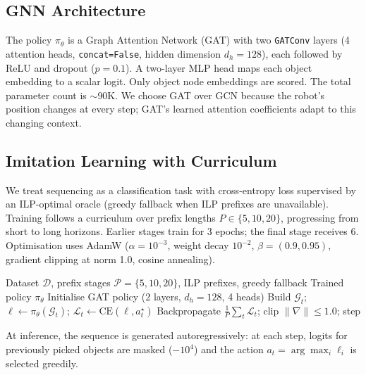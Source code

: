\documentclass[conference]{IEEEtran}
\begin{document}
\subsection{GNN Architecture}

The policy $\pi_\theta$ is a Graph Attention Network (GAT) with two \texttt{GATConv} layers (4 attention heads, \texttt{concat=False}, hidden dimension $d_h{=}128$), each followed by ReLU and dropout ($p{=}0.1$). A two-layer MLP head maps each object embedding to a scalar logit. Only object node embeddings are scored. The total parameter count is ${\sim}$90K. We choose GAT over GCN because the robot's position changes at every step; GAT's learned attention coefficients adapt to this changing context.

\subsection{Imitation Learning with Curriculum}

We treat sequencing as a classification task with cross-entropy loss supervised by an ILP-optimal oracle (greedy fallback when ILP prefixes are unavailable). Training follows a curriculum over prefix lengths $P \in \{5, 10, 20\}$, progressing from short to long horizons. Earlier stages train for 3 epochs; the final stage receives 6. Optimisation uses AdamW \cite{loshchilov2019adamw} ($\alpha{=}10^{-3}$, weight decay $10^{-2}$, $\beta{=}(0.9, 0.95)$, gradient clipping at norm 1.0, cosine annealing).

\begin{algorithm}[htbp]
\caption{Curriculum-Based Imitation Learning}
\label{alg:training}
\begin{algorithmic}[1]
\REQUIRE Dataset $\mathcal{D}$, prefix stages $\mathcal{P}{=}\{5,10,20\}$, ILP prefixes, greedy fallback
\ENSURE Trained policy $\pi_\theta$
\STATE Initialise GAT policy (2 layers, $d_h{=}128$, 4 heads)
                \STATE Build $\mathcal{G}_t$; $\ell \leftarrow \pi_\theta(\mathcal{G}_t)$; $\mathcal{L}_t \leftarrow \text{CE}(\ell, a_t^\star)$
            \ENDFOR
            \STATE Backpropagate $\frac{1}{P}\sum_t \mathcal{L}_t$; clip $\|\nabla\|{\le}1.0$; step
        \ENDFOR
    \ENDFOR
\ENDFOR
\end{algorithmic}
\end{algorithm}

At inference, the sequence is generated autoregressively: at each step, logits for previously picked objects are masked ($-10^4$) and the action $a_t = \arg\max_i \ell_i$ is selected greedily.
\end{document}
